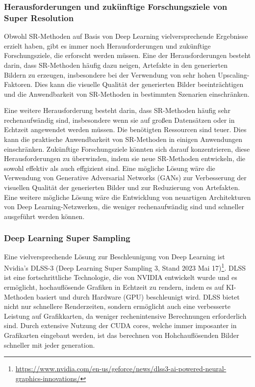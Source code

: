     \subsubsection{Herausforderungen und zukünftige Forschungsziele von Super Resolution}
    
        Obwohl SR-Methoden auf Basis von Deep Learning vielversprechende Ergebnisse erzielt haben, gibt es immer noch Herausforderungen und zukünftige Forschungsziele, die erforscht werden müssen.
        Eine der Herausforderungen besteht darin, dass SR-Methoden häufig dazu neigen, Artefakte in den generierten Bildern zu erzeugen, insbesondere bei der Verwendung von sehr hohen Upscaling-Faktoren.      %
        Dies kann die visuelle Qualität der generierten Bilder beeinträchtigen und die Anwendbarkeit von SR-Methoden in bestimmten Szenarien einschränken.
        
        Eine weitere Herausforderung besteht darin, dass SR-Methoden häufig sehr rechenaufwändig sind, insbesondere wenn sie auf großen Datensätzen oder in Echtzeit angewendet werden müssen.      
        Die benötigten Ressourcen sind teuer.
        Dies kann die praktische Anwendbarkeit von SR-Methoden in einigen Anwendungen einschränken.        
        Zukünftige Forschungsziele könnten sich darauf konzentrieren, diese Herausforderungen zu überwinden, indem sie neue SR-Methoden entwickeln, die sowohl effektiv als auch effgizient sind.      
        Eine mögliche Lösung wäre die Verwendung von Generative Adversarial Networks (GANs) zur Verbesserung der visuellen Qualität der generierten Bilder und zur Reduzierung von Artefakten.      %
        Eine weitere mögliche Lösung wäre die Entwicklung von neuartigen Architekturen von Deep Learning-Netzwerken, die weniger rechenaufwändig sind und schneller ausgeführt werden können.

        \subsubsection{Deep Learning Super Sampling}

        Eine vielversprechende Lösung zur Beschleunigung von Deep Learning ist Nvidia's DLSS-3 (Deep Learning Super Sampling 3, Stand 2023 Mai 17)\footnote{\url{https://www.nvidia.com/en-us/geforce/news/dlss3-ai-powered-neural-graphics-innovations/}}. 
        DLSS ist eine fortschrittliche Technologie, die von NVIDIA entwickelt wurde und es ermöglicht, hochauflösende Grafiken in Echtzeit zu rendern, indem es auf KI-Methoden basiert und durch Hardware (GPU) beschleunigt wird.
        DLSS bietet nicht nur schnellere Renderzeiten, sondern ermöglicht auch eine verbesserte Leistung auf Grafikkarten, da weniger rechenintensive Berechnungen erforderlich sind.
        Durch extensive Nutzung der CUDA cores, welche immer imposanter in Grafikarten eingebaut werden, ist das berechnen von Hohchauflösenden Bilder schneller mit jeder generation.
            
